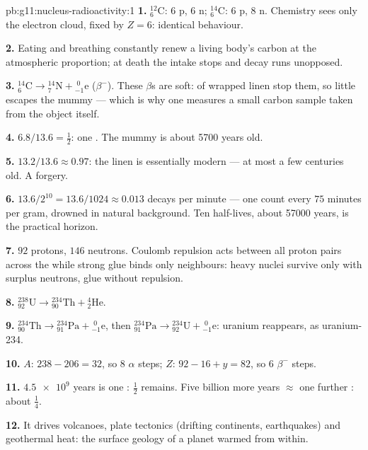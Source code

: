 \begin{solution}{pb:g11:nucleus-radioactivity:1}
\textbf{1.} ${}^{12}_{6}\mathrm{C}$: $6$ p, $6$ n; ${}^{14}_{6}\mathrm{C}$:
$6$ p, $8$ n. Chemistry sees only the electron cloud, fixed by $Z = 6$:
identical behaviour.

\textbf{2.} Eating and breathing constantly renew a living body's carbon
at the atmospheric proportion; at death the intake stops and decay runs
unopposed.

\textbf{3.} ${}^{14}_{6}\mathrm{C} \to {}^{14}_{7}\mathrm{N} +
{}^{\;0}_{-1}\mathrm{e}$ ($\beta^-$). These $\beta$s are soft:  of
wrapped linen stop them, so little escapes the mummy --- which is why one
measures a small carbon sample taken from the object itself.

\textbf{4.} $6.8/13.6 = \frac12$: one . The mummy is about
\num{5700} years old.

\textbf{5.} $13.2/13.6 \approx 0.97$: the linen is essentially modern ---
at most a few centuries old. A forgery.

\textbf{6.} $13.6/2^{10} = 13.6/1024 \approx 0.013$ decays per minute ---
one count every $75$ minutes per gram, drowned in natural background. Ten
half-lives, about \num{57000} years, is the practical horizon.

\textbf{7.} $92$ protons, $146$ neutrons. Coulomb repulsion acts between
all proton pairs across the  while strong glue binds only
neighbours: heavy nuclei survive only with surplus neutrons, glue without
repulsion.

\textbf{8.} ${}^{238}_{92}\mathrm{U} \to {}^{234}_{90}\mathrm{Th} +
{}^{4}_{2}\mathrm{He}$.

\textbf{9.} ${}^{234}_{90}\mathrm{Th} \to {}^{234}_{91}\mathrm{Pa} +
{}^{\;0}_{-1}\mathrm{e}$, then ${}^{234}_{91}\mathrm{Pa} \to
{}^{234}_{92}\mathrm{U} + {}^{\;0}_{-1}\mathrm{e}$: uranium reappears, as
uranium-234.

\textbf{10.} $A$: $238 - 206 = 32$, so $8$ $\alpha$ steps; $Z$:
$92 - 16 + y = 82$, so $6$ $\beta^-$ steps.

\textbf{11.} $\num{4.5e9}$ years is one : $\frac12$ remains. Five
billion more years $\approx$ one further : about $\frac14$.

\textbf{12.} It drives volcanoes, plate tectonics (drifting continents,
earthquakes) and geothermal heat: the surface geology of a planet warmed
from within.


\end{solution}
